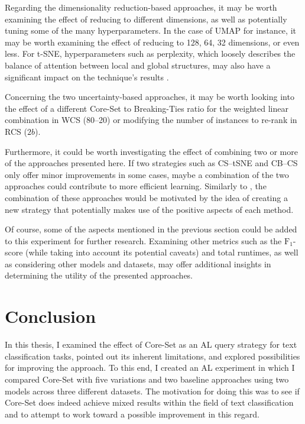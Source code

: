 \documentclass[english,bachelor,ul]{webisthesis} %
\begin{document}
Regarding the dimensionality reduction-based approaches, it may be worth examining the effect of reducing to different dimensions, as well as potentially tuning some of the many hyperparameters. In the case of UMAP for instance, it may be worth examining the effect of reducing to 128, 64, 32 dimensions, or even less. For t-SNE, hyperparameters such as perplexity, which loosely describes the balance of attention between local and global structures, may also have a significant impact on the technique's results \citep{wattenberg2016how}. 

Concerning the two uncertainty-based approaches, it may be worth looking into the effect of a different Core-Set to Breaking-Ties ratio for the weighted linear combination in WCS (80--20) or modifying the number of instances to re-rank in RCS ($2b$). 

Furthermore, it could be worth investigating the effect of combining two or more of the approaches presented here. If two strategies such as CS--tSNE and CB--CS only offer minor improvements in some cases, maybe a combination of the two approaches could contribute to more efficient learning. Similarly to \cite{DBLP:journals/corr/abs-2110-03785}, the combination of these approaches would be motivated by the idea of creating a new strategy that potentially makes use of the positive aspects of each method. 

Of course, some of the aspects mentioned in the previous section could be added to this experiment for further research. Examining other metrics such as the $\text{F}_1$-score (while taking into account its potential caveats) and total runtimes, as well as considering other models and datasets, may offer additional insights in determining the utility of the presented approaches. 

\chapter{Conclusion}

In this thesis, I examined the effect of Core-Set as an AL query strategy for text classification tasks, pointed out its inherent limitations, and explored possibilities for improving the approach. To this end, I created an AL experiment in which I compared Core-Set with five variations and two baseline approaches using two models across three different datasets. The motivation for doing this was to see if Core-Set does indeed achieve mixed results within the field of text classification and to attempt to work toward a possible improvement in this regard. 
\end{document}
